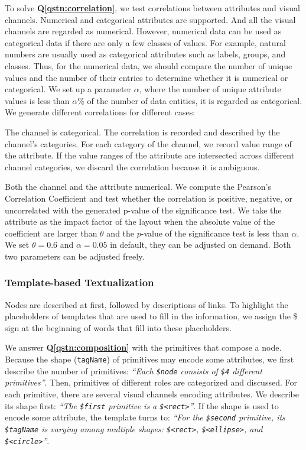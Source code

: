 To solve \textbf{Q\ref{qstn:correlation}}, we test correlations between attributes and visual channels.
Numerical and categorical attributes are supported.
And all the visual channels are regarded as numerical.
However, numerical data can be used as categorical data if there are only a few classes of values.
For example, natural numbers are usually used as categorical attributes such as labels, groups, and classes.
Thus, for the numerical data, we should compare the number of unique values and the number of their entries to determine whether it is numerical or categorical.
We set up a parameter $\alpha$, where the number of unique attribute values is less than $\alpha \%$ of the number of data entities, it is regarded as categorical.
We generate different correlations for different cases:
\begin{compactitem}
    \item The channel is categorical. The correlation is recorded and described by the channel's categories. For each category of the channel, we record value range of the attribute. %
    If the value ranges of the attribute are intersected across different channel categories, we discard the correlation because it is ambiguous.
    \item Both the channel and the attribute numerical. We compute the Pearson's Correlation Coefficient and test whether the correlation is positive, negative, or uncorrelated with the generated p-value of the significance test. We take the attribute as the impact factor of the layout when the absolute value of the coefficient are larger than $\theta$ and the $p$-value of the significance test is less than $\alpha$. We set $\theta = 0.6$ and $\alpha = 0.05$ in default, they can be adjusted on demand.
    Both two parameters can be adjusted freely.
\end{compactitem}


\subsubsection {Template-based Textualization}
Nodes are described at first, followed by descriptions of links. 
To highlight the placeholders of templates that are used to fill in the information, we assign the \$ sign at the beginning of words that fill into these placeholders.

We answer \textbf{Q\ref{qstn:composition}} with the primitives that compose a node.
Because the shape (\texttt{tagName}) of primitives may encode some attributes, we first describe the number of primitives:
\textit{``Each \texttt{\$node} consists of \texttt{\$4} different primitives''}. 
Then, primitives of different roles are categorized and discussed. 
For each primitive, there are several visual channels encoding attributes.
We describe its shape first: \textit{``The \texttt{\$first} primitive is a \texttt{\$<rect>}''}.
If the shape is used to encode some attribute, the template turns to: \textit{``For the \texttt{\$second} primitive, its \texttt{\$tagName} is varying among multiple shapes: \texttt{\$<rect>}, \texttt{\$<ellipse>}, and \texttt{\$<circle>}''}.

